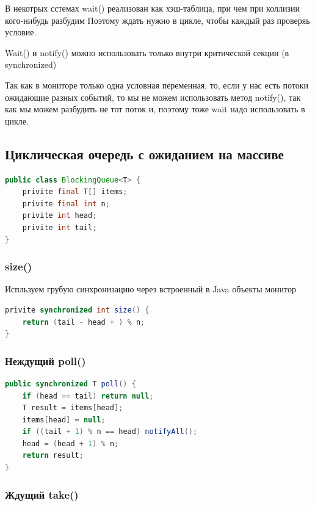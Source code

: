 \documentclass[10pt,a4paper,oneside,titlepage]{article}
\theoremstyle{plain}
\theoremstyle{defenition}
\begin{document}
В некотрых сстемах wait() реализован как хэш-таблица, при чем при коллизии кого-нибудь разбудим Поэтому ждать нужно в цикле, чтобы каждый раз проверяь условие.

Wait() и notify() можно использовать только внутри критической секции (в synchronized)

Так как в мониторе только одна условная переменная, то, если у нас есть потоки ожидающие разных событий, то мы не можем использовать метод notify(), так как мы можем разбудить не тот поток и, поэтому тоже wait надо использовать в цикле.

\subsection{Циклическая очередь с ожиданием на массиве}

\begin{lstlisting}[language=Java]
public class BlockingQueue<T> {
    privite final T[] items;
    privite final int n;
    privite int head;
    privite int tail; 
}
\end{lstlisting}

\subsubsection{size()}

Испльзуем грубую синхронизацию через встроенный в Java объекты монитор

\begin{lstlisting}[language=Java]
privite synchronized int size() {
    return (tail - head + ) % n;
}
\end{lstlisting}

\subsubsection[poll()]{Неждущий poll()}

\begin{lstlisting}[language=Java]
public synchronized T poll() {
    if (head == tail) return null;
    T result = items[head];
    items[head] = null;
    if ((tail + 1) % n == head) notifyAll();
    head = (head + 1) % n;
    return result; 
}
\end{lstlisting}

\subsubsection[take()]{Ждущий take()}
\end{document}
